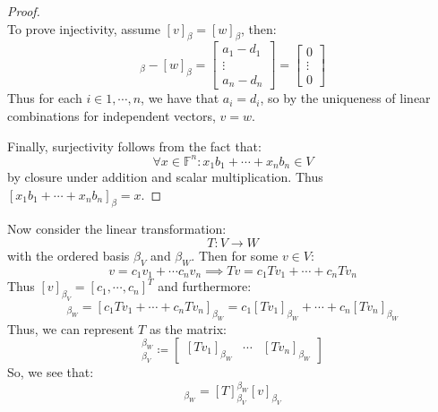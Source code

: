 \documentclass[10pt,letterpaper]{article} %
\begin{document}
\begin{proof}
\begin{equation*}
\end{equation*}
To prove injectivity, assume $[v]_\beta = [w]_\beta$, then:
\begin{equation*}
[v]_\beta - [w]_\beta = \begin{bmatrix}
a_1 - d_1\\ \vdots \\ a_n - d_n
\end{bmatrix} = \begin{bmatrix}
0 \\ \vdots \\ 0
\end{bmatrix}
\end{equation*}
Thus for each $i \in {1, \cdots, n}$, we have that $a_i = d_i$, so by the uniqueness of linear combinations for independent vectors, $v = w$.

Finally, surjectivity follows from the fact that:
\begin{equation*}
\forall x \in \mathbb{F}^n: x_1b_1 + \cdots + x_nb_n \in V
\end{equation*}
by closure under addition and scalar multiplication. Thus $[x_1b_1 + \cdots + x_nb_n]_\beta = x$.
\end{proof}
Now consider the linear transformation:
\begin{equation*}
T: V \xrightarrow{} W
\end{equation*}
with the ordered basis $\beta_V$ and $\beta_W$. Then for some $v \in V$:
\begin{equation*}
v = c_1v_1 + \cdots c_nv_n \implies Tv = c_1Tv_1 + \cdots + c_nTv_n
\end{equation*}
Thus $[v]_{\beta_V} = [c_1, \cdots, c_n]^T$ and furthermore:
\begin{equation*}
[Tv]_{\beta_W} = [c_1Tv_1 + \cdots + c_nTv_n]_{\beta_W} = c_1[Tv_1]_{\beta_W} + \cdots + c_n[Tv_n]_{\beta_W}
\end{equation*}
Thus, we can represent $T$ as the matrix:
\begin{equation*}
[T]_{\beta_V}^{\beta_W} \coloneq \begin{bmatrix}
[Tv_1]_{\beta_W} & \cdots & [Tv_n]_{\beta_W}
\end{bmatrix}
\end{equation*}
So, we see that:
\begin{equation*}
[Tv]_{\beta_W} = [T]_{\beta_V}^{\beta_W}[v]_{\beta_V}
\end{equation*}
\end{document}

